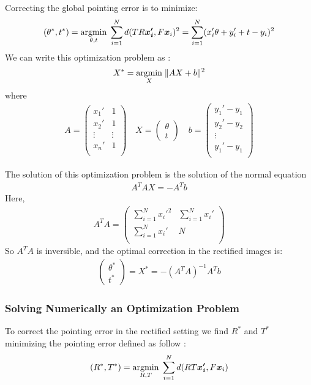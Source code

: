 \documentclass[paper=a4, fontsize=11pt, onecolumn, tikz, dvipsnames, svgnames, x11names]{article}
\begin{document}
Correcting the global pointing error is to minimize:
\begin{align*}
(\theta^*, t^*) = \underset{\theta,t}{\operatorname{argmin}}\; \sum_{i=1}^N d(TR\bm{x_i'}, F\bm{x}_i)^2 = \sum_{i=1}^N (x_i' \theta   + y_i' + t - y_i)^2
\end{align*}
We can write this optimization problem as :
\begin{align*}
X^* = \underset{X}{\operatorname{argmin}}\; \| AX + b \|^2
\end{align*}
where 
\begin{align*}
A =
\begin{pmatrix}
x_1' & 1 \\
x_2' & 1 \\
\vdots & \vdots \\
x_n' & 1 \\
\end{pmatrix} \quad
X =
\begin{pmatrix}
\theta \\
t
\end{pmatrix} \quad
b =
\begin{pmatrix}
y_1' - y_1\\
y_2' - y_2\\
\vdots\\
y_1' - y_1\\
\end{pmatrix}
\end{align*}

The solution of this optimization problem is the solution of the normal equation
\begin{align*}
 A^TAX = -A^Tb
\end{align*}
Here, 
\begin{align*}
A^TA = 
\begin{pmatrix}
\sum\limits_{i=1}^N x_{i}'^2 & \sum\limits_{i=1}^Nx_{i}' \\
\sum\limits_{i=1}^N x_{i}' & N \\
\end{pmatrix}
\end{align*}
So $A^TA$ is inversible, and the optimal correction in the rectified images is:
\begin{align*}
\begin{pmatrix}
\theta^* \\
t^*
\end{pmatrix} = X^* = -(A^TA)^{-1}A^Tb
\end{align*}


\subsubsection{Solving Numerically an Optimization Problem}
To correct the pointing error in the rectified setting we find $R^*$ and $T^*$ minimizing the pointing error defined as follow :
\begin{align}
    (R^*, T^*) = \underset{R,T}{\operatorname{argmin}}\; \sum_{i=1}^N d(RT\bm{x_i'}, F\bm{x}_i)
\end{align}
\end{document}
